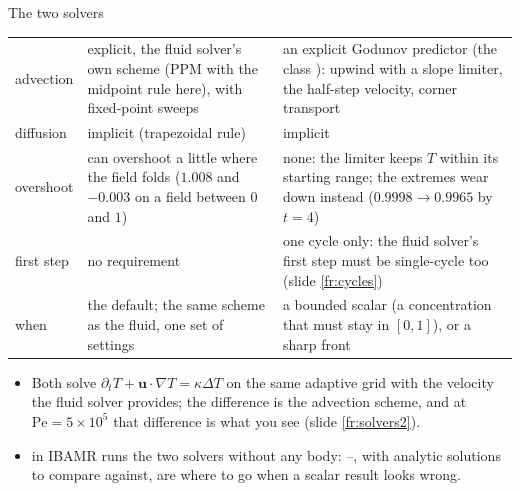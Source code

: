 \documentclass[aspectratio=169,11pt]{beamer}
\begin{document}
\begin{frame}{The two solvers}
\label{fr:solvers}
\footnotesize
\begin{tabular}{@{}L{0.2\textwidth}L{0.36\textwidth}L{0.36\textwidth}@{}}
\toprule
&  &  \\
\midrule
advection & explicit, the fluid solver's own scheme (PPM with the midpoint rule here), with  fixed-point sweeps & an explicit Godunov predictor (the class \newline{}): upwind with a slope limiter, the half-step velocity, corner transport \\
diffusion & implicit (trapezoidal rule) & implicit \\
overshoot & can overshoot a little where the field folds ($1.008$ and $-0.003$ on a field between $0$ and $1$) & none: the limiter keeps $T$ within its starting range; the extremes wear down instead ($0.9998 \to 0.9965$ by $t = 4$) \\
first step & no requirement & one cycle only: the fluid solver's first step must be single-cycle too (slide \ref{fr:cycles}) \\
when & the default; the same scheme as the fluid, one set of settings & a bounded scalar (a concentration that must stay in $[0, 1]$), or a sharp front \\
\bottomrule
\end{tabular}

\medskip
\begin{itemize}
  \item Both solve $\partial_t T + \mathbf{u}\cdot\nabla T = \kappa\Delta T$ on the same adaptive grid with the velocity the fluid solver provides; the difference is the advection scheme, and at $\mathrm{Pe} = 5\times10^5$ that difference is what you see (slide \ref{fr:solvers2}).
  \item {} in IBAMR runs the two solvers without any body: --, with analytic solutions to compare against, are where to go when a scalar result looks wrong.
\end{itemize}
\end{frame}
\end{document}
